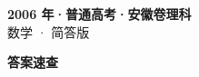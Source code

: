 \documentclass[zihao=-4, a4paper]{ctexart}
\begin{document}
\begin{center}
  {\Large\bfseries 2006 年·普通高考·安徽卷理科}\\[4pt]
  {\large 数学 · 简答版}
\end{center}
\medskip
{}

\clearpage
{}
\begin{center}{\Large\bfseries 答案速查}\end{center}
\medskip

\end{document}
